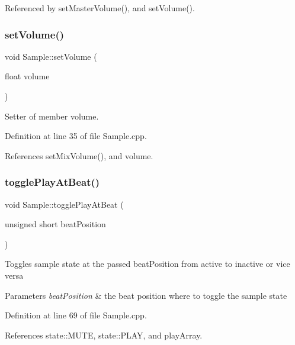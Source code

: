 Referenced by set\+Master\+Volume(), and set\+Volume().

\mbox{\label{class_sample_ae298bfb5c8c1c3c867fa962e799a2fa5}} 
\subsubsection{\texorpdfstring{set\+Volume()}{setVolume()}}
{\footnotesize\ttfamily void Sample\+::set\+Volume (\begin{DoxyParamCaption}\item[{float}]{volume }\end{DoxyParamCaption})}



Setter of member volume. 



Definition at line 35 of file Sample.\+cpp.



References set\+Mix\+Volume(), and volume.

\mbox{\label{class_sample_a4bf009853c35f7a29955fa2554d8e799}} 
\subsubsection{\texorpdfstring{toggle\+Play\+At\+Beat()}{togglePlayAtBeat()}}
{\footnotesize\ttfamily void Sample\+::toggle\+Play\+At\+Beat (\begin{DoxyParamCaption}\item[{unsigned short}]{beat\+Position }\end{DoxyParamCaption})}

Toggles sample state at the passed beat\+Position from active to inactive or vice versa 
\begin{DoxyParams}{Parameters}
{\em beat\+Position} & the beat position where to toggle the sample state \\
\hline
\end{DoxyParams}


Definition at line 69 of file Sample.\+cpp.



References state\+::\+M\+U\+TE, state\+::\+P\+L\+AY, and play\+Array.



